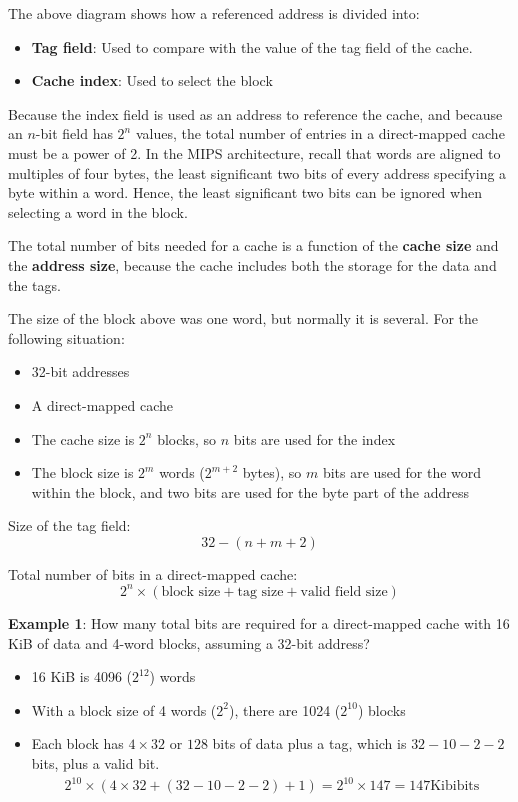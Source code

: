 \documentclass[10pt,a4paper]{article}
\begin{document}
The above diagram shows how a referenced address is divided into:
\begin{itemize}
    \item \textbf{Tag field}: Used to compare with the value of the tag field of the 
    cache.

    \item \textbf{Cache index}: Used to select the block
\end{itemize}

Because the index field is used as an address to reference the cache, and because an $n$-bit field
has $2^n$  values, the total number of entries in a direct-mapped cache must be a power of 2. In the
MIPS architecture, recall that words are aligned to multiples of four bytes, the least significant two
bits of every address specifying a byte within a word. Hence, the least significant two bits can be
ignored when selecting a word in the block.

The total number of bits needed for a cache is a function of the \textbf{cache size} and the
\textbf{address size}, because the cache includes both the storage for the data and the tags.

\pagebreak

The size of the block above was one word, but normally it is several. For the following situation:
\begin{itemize}
    \item 32-bit addresses
    \item A direct-mapped cache
    \item The cache size is $2^n$ blocks, so $n$ bits are used for the index
    \item The block size is $2^m$ words ($2^{m+2}$ bytes), so $m$ bits are used for the word within 
    the block, and two bits are used for the byte part of the address
\end{itemize}

Size of the tag field: $$32 - (n  + m + 2)$$

Total number of bits in a direct-mapped cache: $$2^n \times (\text{block size} + \text{tag size} + \text{valid field size})$$

\textbf{Example 1}: How many total bits are required for a direct-mapped cache with 16 KiB of 
data and 4-word blocks, assuming a 32-bit address?
\begin{itemize}
    \item 16 KiB is 4096 ($2^{12}$) words
    \item With a block size of 4 words ($2^2$), there are 1024 ($2^{10}$) blocks 
    \item  Each block has $4 \times 32$ or $128$ bits of data plus a  tag, which is $32 - 10 - 2 -
    2$ bits, plus a valid bit. 
    \begin{align*}
        2^{10} \times (4 \times 32 + (32 - 10 - 2 - 2) + 1) = 2^{10}  \times 147 = 147 \text{Kibibits}
    \end{align*}
\end{itemize}
\end{document}
